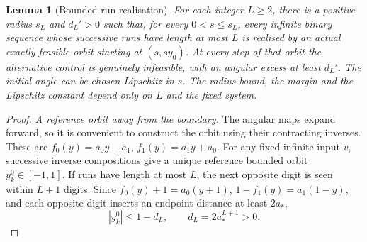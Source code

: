 \documentclass[11pt]{amsart}
\newtheorem{lemma}[theorem]{Lemma}
\theoremstyle{definition}
\theoremstyle{remark}
\numberwithin{equation}{section}
\begin{document}
\begin{lemma}[Bounded-run realisation]\label{lem:shadow}
For each integer \(L\ge2\), there is a positive radius \(s_L\)
and \(d_L'>0\) such that, for every \(0<s\le s_L\), every
infinite binary sequence whose successive runs have length at most
\(L\) is realised by an actual exactly feasible orbit starting at
\((s,sy_0)\).
At every step of that orbit the alternative control is genuinely
infeasible, with an angular excess at least \(d_L'\).
The initial angle can be chosen Lipschitz in $s$. The radius
bound, the margin and the Lipschitz constant depend only on $L$
and the fixed system.

\end{lemma}
\begin{proof}
\emph{A reference orbit away from the boundary.}
The angular maps expand forward, so it is convenient to construct
the orbit using their contracting inverses. These are
\(f_0(y)=a_0y-a_1\), \(f_1(y)=a_1y+a_0\).
For any fixed infinite input \(v\), successive inverse compositions
give a unique reference bounded orbit \(y_k^0\in[-1,1]\).
If runs have length at most \(L\), the next opposite digit is seen
within \(L+1\) digits. Since
\(f_0(y)+1=a_0(y+1)\), \(1-f_1(y)=a_1(1-y)\), and each opposite
digit inserts an endpoint distance at least \(2a_*\),
\begin{equation}
|y_k^0|\le1-d_L,
              \qquad d_L=2a_*^{L+1}>0.                     \label{eq:refmargin}
\end{equation}


\end{proof}
\end{document}
